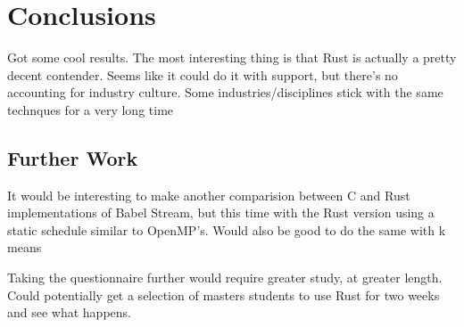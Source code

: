 \chapter{Conclusions}
Got some cool results. The most interesting thing is that Rust is actually a pretty decent contender. Seems like it could do it with support, but there's no accounting for industry culture. Some industries/disciplines stick with the same technques for a very long time

\section{Further Work}\label{sec:furth}
It would be interesting to make another comparision between C and Rust implementations of Babel Stream, but this time with the Rust version using a static schedule similar to OpenMP's. Would also be good to do the same with k means

Taking the questionnaire further would require greater study, at greater length. Could potentially get a selection of masters students to use Rust for two weeks and see what happens.
